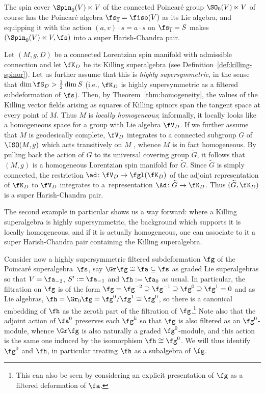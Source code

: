 \begin{Example}
The spin cover $\Spin_0(V)\ltimes V$ of the connected Poincar\'e group $\SO_0(V)\ltimes V$ of course has the Poincar\'e algebra $\fs_{\overline 0}=\fiso(V)$ as its Lie algebra, and equipping it with the action $(a,v)\cdot s = a\cdot s$ on $\fs_{\overline 1}=S$ makes $(\Spin_0(V)\ltimes V,\fs)$ into a super Harish-Chandra pair.
\end{Example}

\begin{Example}
Let $(M,g,D)$ be a connected Lorentzian spin manifold with admissible connection and let $\fK_D$ be its Killing superalgebra (see Definition~\ref{def:killing-spinor}). Let us further assume that this is \emph{highly supersymmetric}, in the sense that $\dim\fS_D>\frac{1}{2}\dim S$ (i.e., $\fK_D$ is highly supersymmetric as a filtered subdeformation of $\fs$). Then, by Theorem~\ref{thm:homogeneity}, the values of the Killing vector fields arising as squares of Killing spinors span the tangent space at every point of $M$. Thus $M$ is \emph{locally homogeneous}; informally, it locally looks like a homogeneous space for a group with Lie algebra $\fV_D$. If we further assume that $M$ is geodesically complete, $\fV_D$ integrates to a connected subgroup $G$ of $\ISO(M,g)$ which acts transitively on $M$ \cite[Theorem~2.2]{Stehney1980}, whence $M$ is in fact homogeneous. By pulling back the action of $G$ to its universal covering group $\widetilde{G}$, it follows that $(M,g)$ is a homogeneous Lorentzian spin manifold for $\widetilde{G}$. Since $\widetilde{G}$ is simply connected, the restriction $\ad\colon\fV_D\to\fgl(\fK_D)$ of the adjoint representation of $\fK_D$ to $\fV_D$ integrates to a~representation $\Ad\colon\widetilde{G}\to\fK_D$. Thus $(\widetilde{G},\fK_D)$ is a super Harish-Chandra pair.
\end{Example}

The second example in particular shows us a way forward: where a Killing superalgebra is highly supersymmetric, the background which supports it is locally homogeneous, and if it is actually homogeneous, one can associate to it a super Harish-Chandra pair containing the Killing superalgebra.

Consider now a highly supersymmetric filtered subdeformation $\fg$ of the Poincar\'e superalgebra~$\fs$, say $\Gr\fg\cong\fa\subseteq\fs$ as graded Lie superalgebras so that $V=\fa_{-2}$, $S':=\fa_{-1}$ and $\fh:=\fa_0$ as usual. In particular, the filtration on $\fg$ is of the form $\fg=\fg^{-2}\supseteq\fg^{-1}\supseteq\fg^0\supseteq\fg^1=0$ and as Lie algebras, $\fh=\Gr_0\fg=\fg^0/\fg^1\cong\fg^0$, so there is a canonical embedding of $\fh$ as the zeroth part of the filtration of $\fg$.\footnote{This can also be seen by considering an explicit presentation of $\fg$ as a filtered deformation of $\fa$.}
Note also that the adjoint action of $\fa^0$ preserves each $\fg^k$ so that $\fg$ is also filtered as an $\fg^0$-module, whence $\Gr\fg$ is also naturally a graded $\fg^0$-module, and this action is the same one induced by the isomorphism $\fh\cong\fg^0$. We will thus identify $\fg^0$ and $\fh$, in particular treating $\fh$ as a subalgebra of $\fg$.


